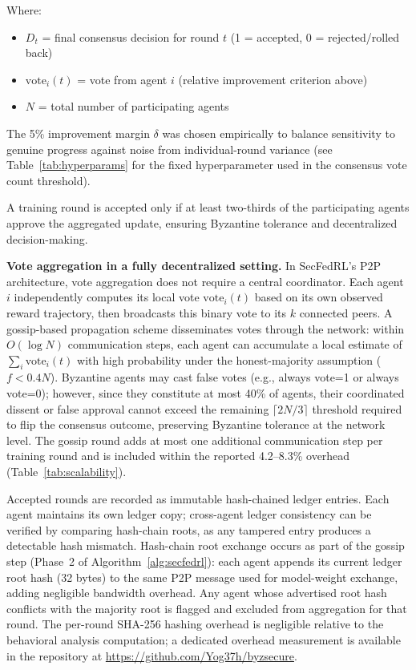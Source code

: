 \documentclass[12pt,a4paper]{article}
\begin{document}
\noindent Where:
\begin{itemize}
  \item $D_t$ = final consensus decision for round $t$ (1 = accepted, 0 = rejected/rolled back)
  \item $\mathrm{vote}_i(t)$ = vote from agent $i$ (relative improvement criterion above)
  \item $N$ = total number of participating agents
\end{itemize}

The 5\% improvement margin $\delta$ was chosen empirically to balance sensitivity to
genuine progress against noise from individual-round variance (see Table~\ref{tab:hyperparams}
for the fixed hyperparameter used in the consensus vote count threshold).

A training round is accepted only if at least two-thirds of the participating agents
approve the aggregated update, ensuring Byzantine tolerance and decentralized
decision-making.

\noindent\textbf{Vote aggregation in a fully decentralized setting.}
In SecFedRL's P2P architecture, vote aggregation does not require a central coordinator.
Each agent $i$ independently computes its local vote $\mathrm{vote}_i(t)$ based on its
own observed reward trajectory, then broadcasts this binary vote to its $k$ connected
peers. A gossip-based propagation scheme disseminates votes through the network: within
$O(\log N)$ communication steps, each agent can accumulate a local estimate of
$\sum_i \mathrm{vote}_i(t)$ with high probability under the honest-majority assumption
($f < 0.4N$). Byzantine agents may cast false votes (e.g., always vote=1 or always
vote=0); however, since they constitute at most 40\% of agents, their coordinated
dissent or false approval cannot exceed the remaining $\lceil 2N/3 \rceil$ threshold
required to flip the consensus outcome, preserving Byzantine tolerance at the
network level. The gossip round adds at most one additional communication step per
training round and is included within the reported 4.2--8.3\% overhead (Table~\ref{tab:scalability}).

Accepted rounds are recorded as immutable hash-chained ledger entries. Each agent
maintains its own ledger copy; cross-agent ledger consistency can be verified by
comparing hash-chain roots, as any tampered entry produces a detectable hash
mismatch. Hash-chain root exchange occurs as part of the gossip step (Phase~2 of
Algorithm~\ref{alg:secfedrl}): each agent appends its current ledger root hash
(32 bytes) to the same P2P message used for model-weight exchange, adding negligible
bandwidth overhead. Any agent whose advertised root hash conflicts with the majority
root is flagged and excluded from aggregation for that round. The per-round SHA-256 hashing overhead is negligible relative to the
behavioral analysis computation; a dedicated overhead measurement is available in the
repository at \url{https://github.com/Yog37h/byzsecure}.
\end{document}
